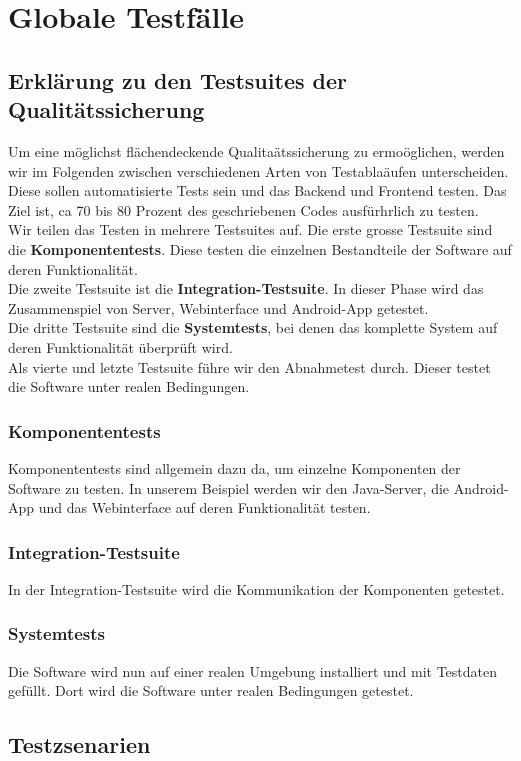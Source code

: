 \section{Globale Testf\"alle}
\subsection{Erkl\"arung zu den Testsuites der Qualit\"atssicherung}
Um eine m\"oglichst fl\"achendeckende Qualita\"atssicherung zu ermo\"oglichen, werden wir im Folgenden zwischen verschiedenen Arten von Testabla\"aufen unterscheiden. Diese sollen automatisierte Tests sein und das Backend und Frontend testen. Das Ziel ist, ca 70 bis 80 Prozent des geschriebenen Codes ausf\"urhrlich zu testen. \\
Wir teilen das Testen in mehrere Testsuites auf. Die erste grosse Testsuite sind die \textbf{Komponententests}. Diese testen die einzelnen Bestandteile der Software auf deren Funktionalit\"at. \\
Die zweite Testsuite ist die \textbf{Integration-Testsuite}. In dieser Phase wird das Zusammenspiel von Server, Webinterface und Android-App getestet.  \\
Die dritte Testsuite sind die \textbf{Systemtests}, bei denen das komplette System auf deren Funktionalit\"at \"uberpr\"uft wird. \\
Als vierte und letzte Testsuite f\"uhre wir den Abnahmetest durch. Dieser testet die Software unter realen Bedingungen.
\subsubsection{Komponententests}
Komponententests sind allgemein dazu da, um einzelne Komponenten der Software zu testen. In unserem Beispiel werden wir den Java-Server, die Android-App und das Webinterface auf deren Funktionalit\"at testen. 
\subsubsection{Integration-Testsuite}
In der Integration-Testsuite wird die Kommunikation der Komponenten getestet.
\subsubsection{Systemtests}
Die Software wird nun auf einer realen Umgebung installiert und mit Testdaten gef\"ullt. Dort wird die Software unter realen Bedingungen getestet.

\subsection{Testzsenarien}
